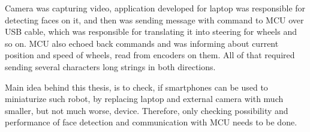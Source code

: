 Camera was capturing video, application developed for laptop was responsible for
detecting faces on it, and then was sending message with command to MCU over
USB cable, which was responsible for translating it into steering for wheels and
so on.
MCU also echoed back commands and was informing about current position and speed
of wheels, read from encoders on them. All of that required sending several
characters long strings in both directions.

Main idea behind this thesis, is to check, if smartphones can be used to
miniaturize such robot, by replacing laptop and external camera with much
smaller, but not much worse, device.
Therefore, only checking possibility and performance of face detection and
communication with MCU needs to be done.
